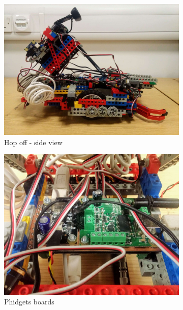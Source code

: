 \begin{figure}[ht]
    \centering
    \begin{subfigure}{0.4\textwidth}
        \includegraphics[width=\linewidth, height=0.8\textwidth]{res/robot-pics/top-off-side-view.jpg}
        \caption{Hop off - side view}
    \end{subfigure}
    \medskip
    \begin{subfigure}{0.4\textwidth}
        \includegraphics[width=\linewidth]{res/robot-pics/phidget-boards.jpg}
        \caption{Phidgets boards}
    \end{subfigure}
    \begin{subfigure}{0.4\textwidth}

\end{subfigure}
\end{figure}
